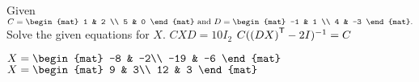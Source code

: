 
\begin{Exercise}[
name={},
title={}, 
difficulty=0,
origin={\cite{YL}}]
Given
$C = \begin{mat}
1 & 2 \\
5 & 0
\end{mat}\text{ and }
D = \begin{mat}
-1 & 1 \\
4 & -3
\end{mat}.
$ Solve the given equations for $X$.
\Question $CXD=10I_2$
\Question $C({{(DX)}^{\mathsf{T}}}-2I)^{-1}=C$
\end{Exercise}

\begin{Answer}
\Question $
X=
\begin{mat}
-8 & -2\\
-19 & -6
\end{mat}
$
\Question $
X=
\begin{mat}
9 & 3\\
12 & 3
\end{mat}
$
\end{Answer}
